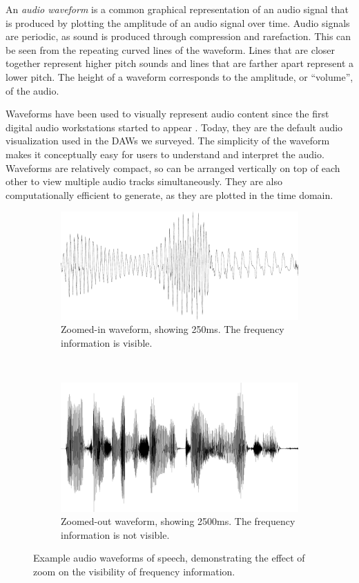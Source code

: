 An \textit{audio waveform} is a common graphical representation of an audio signal that is produced by plotting the
amplitude of an audio signal over time.
Audio signals are periodic, as sound is produced through compression and rarefaction. This can be seen from the
repeating curved lines of the waveform.  Lines that are closer together represent higher pitch sounds and lines that
are farther apart represent a lower pitch.  The height of a waveform corresponds to the amplitude, or ``volume'', of
the audio.


Waveforms have been used to visually represent audio content since the first digital audio workstations started to
appear \citep{Ingebretsen1982}.  Today, they are the default audio visualization used in the DAWs we surveyed.
The simplicity of the waveform makes it conceptually easy for users to understand and interpret the audio.  Waveforms
are relatively compact, so can be arranged vertically on top of each other to view multiple audio tracks
simultaneously. They are also computationally efficient to generate, as they are plotted in the time domain.

\begin{figure}[h]
  \centering
  \begin{subfigure}{\textwidth}
    \centering
    \includegraphics[width=.9\textwidth,height=.2\textwidth]{figs/waveform-zoomin}
    \caption{Zoomed-in waveform, showing 250ms. The frequency information is visible.}
    \label{fig:waveform-zoomin}
  \end{subfigure}
  \\
  \begin{subfigure}{\textwidth}
    \centering
    \includegraphics[width=.9\textwidth,height=.2\textwidth]{figs/waveform-zoomout.png}
    \caption{Zoomed-out waveform, showing 2500ms. The frequency information is not visible.}
    \label{fig:waveform-zoomout}
  \end{subfigure}
  \caption{Example audio waveforms of speech, demonstrating the effect of zoom on the visibility of frequency
  information.}
  \label{fig:waveforms}
\end{figure}

